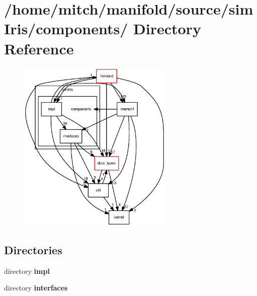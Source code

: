 \section{/home/mitch/manifold/source/simIris/components/ Directory Reference}
\label{dir_085c443f986a1f404b66636bb67b073f}


\nopagebreak
\begin{figure}[H]
\begin{center}
\leavevmode
\includegraphics[width=210pt]{dir_085c443f986a1f404b66636bb67b073f_dep}
\end{center}
\end{figure}
\subsection*{Directories}
\begin{CompactItemize}
\item 
directory {\bf impl}
\item 
directory {\bf interfaces}
\end{CompactItemize}
